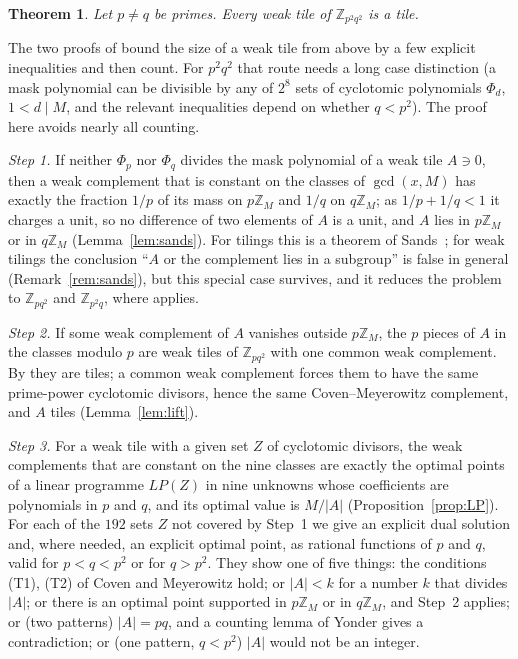 \documentclass[11pt,a4paper]{amsart}
\newtheorem{theorem}{Theorem}
\theoremstyle{definition}
\theoremstyle{remark}
\newcommand{\Z}{\mathbb{Z}}
\begin{document}
\begin{theorem}\label{thm:C}
Let $p\ne q$ be primes. Every weak tile of $\Z_{p^2q^2}$ is a tile.
\end{theorem}

The two proofs of \cite{NY} bound the size of a weak tile from above by a few explicit inequalities and then
count. For $p^2q^2$ that route needs a long case distinction (a mask polynomial can be divisible by any of $2^8$
sets of cyclotomic polynomials $\Phi_d$, $1<d\mid M$, and the relevant inequalities depend on whether $q<p^2$).
The proof here avoids nearly all counting.

\emph{Step 1.} If neither $\Phi_p$ nor $\Phi_q$ divides the mask polynomial of a weak tile $A\ni0$, then a weak
complement that is constant on the classes of $\gcd(x,M)$ has exactly the fraction $1/p$ of its mass on $p\Z_M$
and $1/q$ on $q\Z_M$; as $1/p+1/q<1$ it charges a unit, so no difference of two elements of $A$ is a unit, and
$A$ lies in $p\Z_M$ or in $q\Z_M$ (Lemma~\ref{lem:sands}). For tilings this is a theorem of Sands~\cite{Sa}; for
weak tilings the conclusion ``$A$ or the complement lies in a subgroup'' is false in general
(Remark~\ref{rem:sands}), but this special case survives, and it reduces the problem to $\Z_{pq^2}$ and
$\Z_{p^2q}$, where \cite{NY} applies.

\emph{Step 2.} If some weak complement of $A$ vanishes outside $p\Z_M$, the $p$ pieces of $A$ in the classes
modulo $p$ are weak tiles of $\Z_{pq^2}$ with one common weak complement. By \cite{NY} they are tiles; a common
weak complement forces them to have the same prime-power cyclotomic divisors, hence the same Coven--Meyerowitz
complement, and $A$ tiles (Lemma~\ref{lem:lift}).

\emph{Step 3.} For a weak tile with a given set $Z$ of cyclotomic divisors, the weak complements that are
constant on the nine classes are exactly the optimal points of a linear programme $LP(Z)$ in nine unknowns whose
coefficients are polynomials in $p$ and $q$, and its optimal value is $M/|A|$ (Proposition~\ref{prop:LP}). For
each of the $192$ sets $Z$ not covered by Step~1 we give an explicit dual solution and, where needed, an
explicit optimal point, as rational functions of $p$ and $q$, valid for $p<q<p^2$ or for $q>p^2$. They show one
of five things: the conditions (T1), (T2) of Coven and Meyerowitz hold; or $|A|<k$ for a number $k$ that divides
$|A|$; or there is an optimal point supported in $p\Z_M$ or in $q\Z_M$, and Step~2 applies; or (two patterns)
$|A|=pq$, and a counting lemma of Yonder gives a contradiction; or (one pattern, $q<p^2$) $|A|$ would not be an
integer.
\end{document}
